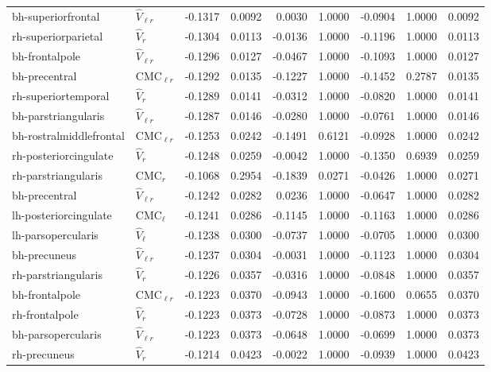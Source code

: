 \documentclass{article}
\begin{document}
\begin{table}
\begin{tabular}{llrrrrrrr}
	bh-superiorfrontal & $\hat{V}_{\ell r}$ & -0.1317 & 0.0092 & 0.0030 & 1.0000 & -0.0904 & 1.0000 & 0.0092 \\
	rh-superiorparietal & $\hat{V}_{r}$ & -0.1304 & 0.0113 & -0.0136 & 1.0000 & -0.1196 & 1.0000 & 0.0113 \\
	bh-frontalpole & $\hat{V}_{\ell r}$ & -0.1296 & 0.0127 & -0.0467 & 1.0000 & -0.1093 & 1.0000 & 0.0127 \\
	bh-precentral & $\text{CMC}_{\ell r}$ & -0.1292 & 0.0135 & -0.1227 & 1.0000 & -0.1452 & 0.2787 & 0.0135 \\
	rh-superiortemporal & $\hat{V}_{r}$ & -0.1289 & 0.0141 & -0.0312 & 1.0000 & -0.0820 & 1.0000 & 0.0141 \\
	bh-parstriangularis & $\hat{V}_{\ell r}$ & -0.1287 & 0.0146 & -0.0280 & 1.0000 & -0.0761 & 1.0000 & 0.0146 \\
	bh-rostralmiddlefrontal & $\text{CMC}_{\ell r}$ & -0.1253 & 0.0242 & -0.1491 & 0.6121 & -0.0928 & 1.0000 & 0.0242 \\
	rh-posteriorcingulate & $\hat{V}_{r}$ & -0.1248 & 0.0259 & -0.0042 & 1.0000 & -0.1350 & 0.6939 & 0.0259 \\
	rh-parstriangularis & $\text{CMC}_r$ & -0.1068 & 0.2954 & -0.1839 & 0.0271 & -0.0426 & 1.0000 & 0.0271 \\
	bh-precentral & $\hat{V}_{\ell r}$ & -0.1242 & 0.0282 & 0.0236 & 1.0000 & -0.0647 & 1.0000 & 0.0282 \\
	lh-posteriorcingulate & $\text{CMC}_{\ell}$ & -0.1241 & 0.0286 & -0.1145 & 1.0000 & -0.1163 & 1.0000 & 0.0286 \\
	lh-parsopercularis & $\hat{V}_{\ell}$ & -0.1238 & 0.0300 & -0.0737 & 1.0000 & -0.0705 & 1.0000 & 0.0300 \\
	bh-precuneus & $\hat{V}_{\ell r}$ & -0.1237 & 0.0304 & -0.0031 & 1.0000 & -0.1123 & 1.0000 & 0.0304 \\
	rh-parstriangularis & $\hat{V}_{r}$ & -0.1226 & 0.0357 & -0.0316 & 1.0000 & -0.0848 & 1.0000 & 0.0357 \\
	bh-frontalpole & $\text{CMC}_{\ell r}$ & -0.1223 & 0.0370 & -0.0943 & 1.0000 & -0.1600 & 0.0655 & 0.0370 \\
	rh-frontalpole & $\hat{V}_{r}$ & -0.1223 & 0.0373 & -0.0728 & 1.0000 & -0.0873 & 1.0000 & 0.0373 \\
	bh-parsopercularis & $\hat{V}_{\ell r}$ & -0.1223 & 0.0373 & -0.0648 & 1.0000 & -0.0699 & 1.0000 & 0.0373 \\
	rh-precuneus & $\hat{V}_{r}$ & -0.1214 & 0.0423 & -0.0022 & 1.0000 & -0.0939 & 1.0000 & 0.0423 \\

\end{tabular}
\end{table}
\end{document}
